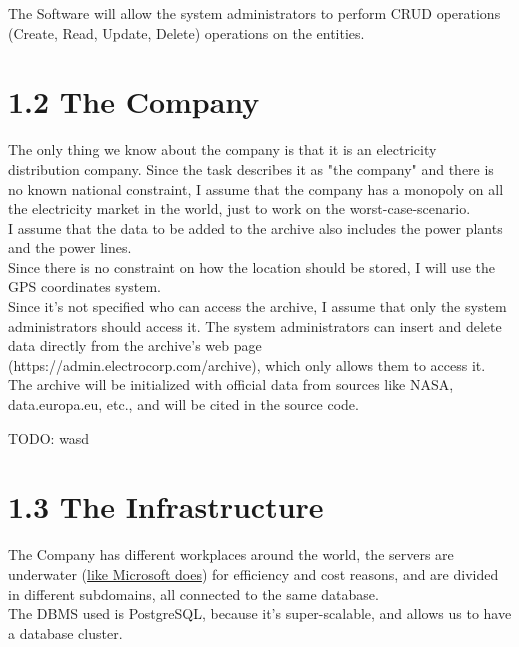The Software will allow the system administrators to perform CRUD operations (Create, Read, Update, Delete) operations on the entities.

\section*{1.2 \hspace{1cm} The Company}
The only thing we know about the company is that it is an electricity distribution company. Since the task describes it as "the company" and there is no known national constraint, I assume that the company has a monopoly on all the electricity market in the world, just to work on the worst-case-scenario. \\

I assume that the data to be added to the archive also includes the power plants and the power lines. \\

Since there is no constraint on how the location should be stored, I will use the GPS coordinates system. \\

Since it's not specified who can access the archive, I assume that only the system administrators should access it. The system administrators can insert and delete data directly from the archive's web page (https://admin.electrocorp.com/archive), which only allows them to access it. \\

The archive will be initialized with official data from sources like NASA, data.europa.eu, etc., and will be cited in the source code.

TODO: wasd

\section*{1.3 \hspace{1cm} The Infrastructure}
The Company has different workplaces around the world, the servers are underwater (\href{https://datacenterfrontier.com/microsoft-servers-in-our-underwater-data-center-are-super-reliable/#:~:text=Microsoft%3A%20Servers%20in%20Our%20Underwater%20Data%20Center%20Are%20Super%2DReliable,-By%20Rich%20Miller&text=Microsoft%20recently%20retrieved%20the%20Project,the%20Orkney%20Islands%20in%20Scotland}{like Microsoft does}) for efficiency and cost reasons, and are divided in different subdomains, all connected to the same database. \\
The DBMS used is PostgreSQL, because it's super-scalable, and allows us to have a database cluster. \\

